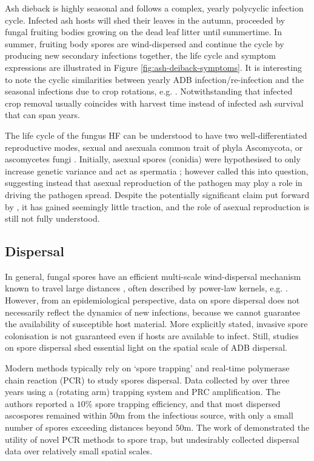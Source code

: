 Ash dieback is highly seasonal \cite{bengtsson2014seasonal} and follows a complex, yearly polycyclic infection cycle.
Infected ash hosts will shed their leaves in the autumn, proceeded by fungal fruiting bodies growing on the dead leaf litter until summertime.
In summer, fruiting body spores are wind-dispersed and continue the cycle by producing new secondary infections\textemdash 
together, the life cycle and symptom expressions are illustrated in Figure \ref{fig:ash-deiback-symptoms}.
It is interesting to note the cyclic similarities between yearly ADB infection/re-infection and the seasonal
infections due to crop rotations, e.g. \cite{tankam2020modelling}. 
Notwithstanding that infected crop removal usually coincides with harvest time instead of infected ash survival that can span years.

The life cycle of the fungus HF can be understood to have two well-differentiated reproductive modes, 
sexual and asexual\textemdash a common trait of phyla Ascomycota, or ascomycetes fungi \cite{hawker2016physiology}.
Initially, asexual spores (conidia) were hypothesised to only increase genetic variance and act as spermatia \cite{gross2014h};
however \cite{fones2016role} called this into question, suggesting instead that asexual reproduction of the pathogen 
may play a role in driving the pathogen spread. Despite the potentially significant claim put forward by \cite{fones2016role},
it has gained seemingly little traction, and the role of asexual reproduction is still not fully understood.

\subsection{Dispersal}

In general, fungal spores have an efficient multi-scale wind-dispersal mechanism
known to travel large distances \cite{golan2017long, wingen2013long, mundt2009aerial},
often described by power-law kernels, e.g. \cite{shaw2006assembling}.
However, from an epidemiological perspective, data on spore dispersal does not necessarily reflect the dynamics of new infections, 
because we cannot guarantee the availability of susceptible host material.
More explicitly stated, invasive spore colonisation is not guaranteed even if hosts are available to infect.
Still, studies on spore dispersal shed essential light on the spatial scale of ADB dispersal. 

Modern methods typically rely on `spore trapping' and real-time polymerase chain reaction (PCR) to study spores dispersal.
Data collected by \cite{chandelier2014detection} over three years using a (rotating arm) trapping system
and PRC amplification. The authors reported a $10\%$ spore trapping efficiency, and that most
dispersed ascospores remained within $50\mathrm{m}$ from the infectious source, with only a small number of spores exceeding 
distances beyond $50\mathrm{m}$. The work of \cite{chandelier2014detection} demonstrated the utility of novel PCR methods
to spore trap, but undesirably collected dispersal data over relatively small spatial scales.

